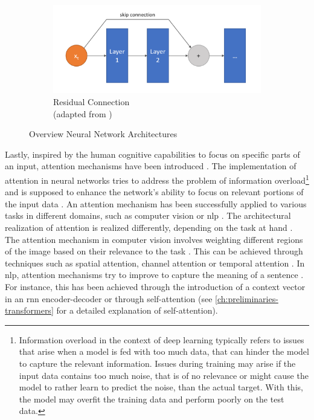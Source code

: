 \begin{figure}[H]
  \begin{subfigure}{0.6\textwidth}
    \centering
    \includegraphics[width=\linewidth]{images/resnet.png}
    \captionsetup{justification=centering}
    \caption{Residual Connection \\(adapted from \cite{hassan2019ResNet3450})} \label{fig:resnet}
  \end{subfigure}
\caption[Overview Neural Network Architectures]{Overview Neural Network Architectures} \label{fig:NN_architectures_Overview}
\end{figure}


Lastly, inspired by the human cognitive capabilities to focus on specific parts of an input, attention mechanisms have been introduced \cite{niu2021ReviewAttentionMechanism, aggarwal2018NeuralNetworksDeep}.
The implementation of attention in neural networks tries to address the problem of information overload\footnote{Information overload in the context of deep learning typically refers to issues that arise when a model is fed with too much data, that can hinder the model to capture the relevant information.
Issues during training may arise if the input data contains too much noise, that is of no relevance or might cause the model to rather learn to predict the noise, than the actual target.
With this, the model may overfit the training data and perform poorly on the test data.} and is supposed to enhance the network's ability to focus on relevant portions of the input data \cite{niu2021ReviewAttentionMechanism}.
An attention mechanism has been successfully applied to various tasks in different domains, such as computer vision or \gls{nlp} \cite{niu2021ReviewAttentionMechanism}.
The architectural realization of attention is realized differently, depending on the task at hand \cite{aggarwal2018NeuralNetworksDeep}.
The attention mechanism in computer vision involves weighting different regions of the image based on their relevance to the task \cite{aggarwal2018NeuralNetworksDeep}. 
This can be achieved through techniques such as spatial attention, channel attention or temporal attention \cite{guo2022AttentionMechanismsComputer}.
In \gls{nlp}, attention mechanisms try to improve to capture the meaning of a sentence \cite{niu2021ReviewAttentionMechanism}. 
For instance, this has been achieved through the introduction of a context vector in an \gls{rnn} encoder-decoder \cite{DBLP:journals/corr/BahdanauCB14} or through self-attention \cite{vaswani2017AttentionAllYou} (see \autoref{ch:preliminaries-transformers} for a detailed explanation of self-attention).

